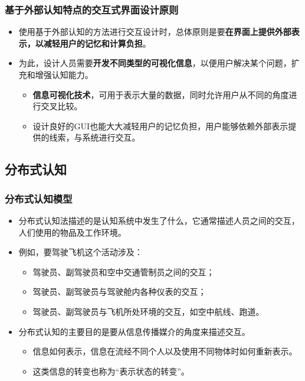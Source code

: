 \documentclass{beamer}
\begin{document}
\begin{frame}
	\frametitle{基于外部认知特点的交互式界面设计原则}
	\beamertemplatetransparentcovereddynamicmedium
	\begin{itemize}
		\item 使用基于外部认知的方法进行交互设计时，总体原则是要\textbf{在界面上提供外部表示，以减轻用户的记忆和计算负担}。\pause
		\item 为此，设计人员需要\textbf{开发不同类型的可视化信息}，以便用户解决某个问题，扩充和增强认知能力。\pause
		\begin{itemize}
			\item \textbf{信息可视化技术}，可用于表示大量的数据，同时允许用户从不同的角度进行交叉比较。 %
			\item 设计良好的GUI也能大大减轻用户的记忆负担，用户能够依赖外部表示提供的线索，与系统进行交互。
		\end{itemize}
	\end{itemize}
\end{frame}

\subsection{分布式认知}
\begin{frame}
	\frametitle{分布式认知模型}
	\beamertemplatetransparentcovereddynamicmedium
	\begin{itemize}
		\item 分布式认知法描述的是认知系统中发生了什么，它通常描述人员之间的交互，人们使用的物品及工作环境。\pause
		\item 例如，要驾驶飞机这个活动涉及：
		\begin{itemize}
			\item 驾驶员、副驾驶员和空中交通管制员之间的交互；
			\item 驾驶员、副驾驶员与驾驶舱内各种仪表的交互；
			\item 驾驶员、副驾驶员与飞机所处环境的交互，如空中航线、跑道。
		\end{itemize}\pause
		\item 分布式认知的主要目的是要从信息传播媒介的角度来描述交互。
		\begin{itemize}
			\item 信息如何表示，信息在流经不同个人以及使用不同物体时如何重新表示。
			\item 这类信息的转变也称为“表示状态的转变”。
		\end{itemize}
	\end{itemize}
\end{frame}
\end{document}

